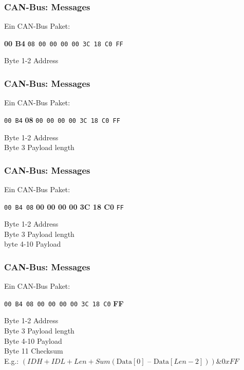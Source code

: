 \documentclass[t]{beamer}
\begin{document}
\begin{frame}
	\frametitle{CAN-Bus: Messages}
    Ein CAN-Bus Paket:
    \newline
    \newline
    \newline
    \newline
    {\Large \centerline{\textbf{00 B4} \texttt{08 00 00 00 00 3C 18 C0 FF}}}
    \vspace*{1cm}

    Byte 1-2 Address
\end{frame}

\begin{frame}
	\frametitle{CAN-Bus: Messages}
    Ein CAN-Bus Paket:
    \newline
    \newline
    \newline
    \newline
    {\Large \centerline{\texttt{00 B4} \textbf{08} \texttt{00 00 00 00 3C 18 C0 FF}}}
    \vspace*{1cm}

    Byte 1-2 Address \\
    Byte 3 Payload length
\end{frame}

\begin{frame}
	\frametitle{CAN-Bus: Messages}
    Ein CAN-Bus Paket:
    \newline
    \newline
    \newline
    \newline
{\Large \centerline{\texttt{00 B4 08} \textbf{00 00 00 00 3C 18 C0} \texttt{FF}}}
    \vspace*{1cm}

    Byte 1-2 Address \\
    Byte 3 Payload length \\
    byte 4-10 Payload
\end{frame}

\begin{frame}
	\frametitle{CAN-Bus: Messages}
    Ein CAN-Bus Paket:
    \newline
    \newline
    \newline
    \newline
{\Large \centerline{\texttt{00 B4 08 00 00 00 00 3C 18 C0} \textbf{FF}}}
    \vspace*{1cm}

    Byte 1-2 Address \\
    Byte 3 Payload length \\
    Byte 4-10 Payload \\
    Byte 11 Checksum \\
    E.g.: $(IDH + IDL + Len + Sum(\text{Data}[0]\text{ – }\text{Data}[Len-2])) \& 0xFF $
\end{frame}
\end{document}
